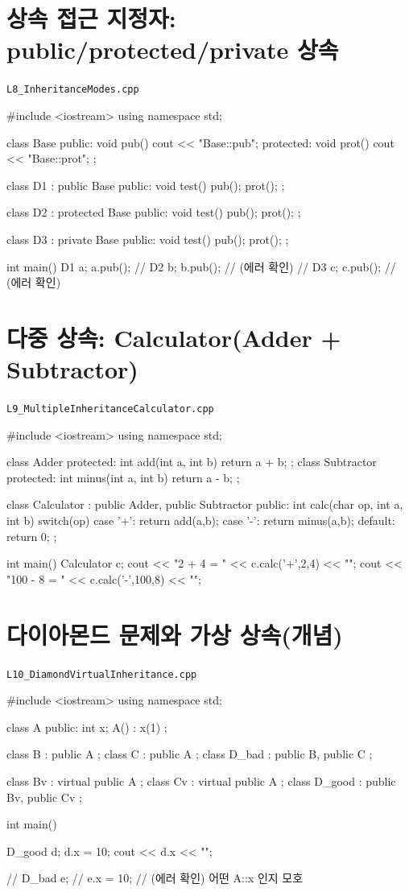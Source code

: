 \documentclass[11pt,a4paper]{article}
\newcommand{\filetag}[1]{\texttt{\color{Accent}#1}}
\begin{document}
\section{상속 접근 지정자: public/protected/private 상속}
\noindent\filetag{L8\_InheritanceModes.cpp}
\begin{cppcode}
#include <iostream>
using namespace std;

class Base {
public:
    void pub() { cout << "Base::pub\n"; }
protected:
    void prot() { cout << "Base::prot\n"; }
};

class D1 : public Base {
public:
    void test() { pub(); prot(); }
};

class D2 : protected Base {
public:
    void test() { pub(); prot(); }
};

class D3 : private Base {
public:
    void test() { pub(); prot(); }
};

int main() {
    D1 a; a.pub();
    // D2 b; b.pub(); // (에러 확인)
    // D3 c; c.pub(); // (에러 확인)
}
\end{cppcode}

\section{다중 상속: Calculator(Adder + Subtractor)}
\noindent\filetag{L9\_MultipleInheritanceCalculator.cpp}
\begin{cppcode}
#include <iostream>
using namespace std;

class Adder {
protected:
    int add(int a, int b) { return a + b; }
};
class Subtractor {
protected:
    int minus(int a, int b) { return a - b; }
};

class Calculator : public Adder, public Subtractor {
public:
    int calc(char op, int a, int b) {
        switch(op) {
        case '+': return add(a,b);
        case '-': return minus(a,b);
        default:  return 0;
        }
    }
};

int main() {
    Calculator c;
    cout << "2 + 4 = " << c.calc('+',2,4) << "\n";
    cout << "100 - 8 = " << c.calc('-',100,8) << "\n";
}
\end{cppcode}

\section{다이아몬드 문제와 가상 상속(개념)}
\noindent\filetag{L10\_DiamondVirtualInheritance.cpp}
\begin{cppcode}
#include <iostream>
using namespace std;

class A {
public:
    int x;
    A() : x(1) {}
};

class B : public A {};
class C : public A {};
class D_bad : public B, public C {};

class Bv : virtual public A {};
class Cv : virtual public A {};
class D_good : public Bv, public Cv {};

int main() {
    D_good d;
    d.x = 10;
    cout << d.x << "\n";

    // D_bad e;
    // e.x = 10; // (에러 확인) 어떤 A::x 인지 모호
}
\end{cppcode}
\end{document}
